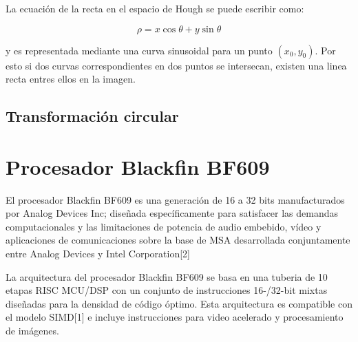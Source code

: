 %


La ecuación de la recta en el espacio de Hough se puede escribir como:

\begin{equation}
\rho = x\cos\theta + y\sin\theta
\end{equation}

y es representada mediante una curva sinusoidal para un punto $(x_{0},y_{0})$. Por esto si dos curvas correspondientes en dos puntos se intersecan, existen una linea recta entres ellos en la imagen.  

\subsection{Transformación circular}


\section{Procesador Blackfin BF609}

El procesador Blackfin BF609 es una generación de 16 a 32 bits manufacturados por Analog Devices Inc; diseñada específicamente para satisfacer las demandas computacionales y las limitaciones de potencia de audio embebido, vídeo y aplicaciones de comunicaciones sobre la base de MSA desarrollada conjuntamente entre Analog Devices y Intel Corporation[2] 

La arquitectura del procesador Blackfin BF609 se basa en una tuberia de 10 etapas RISC MCU/DSP con un conjunto de instrucciones 16-/32-bit mixtas diseñadas para la densidad de código óptimo. Esta arquitectura es compatible con el modelo SIMD[1] e incluye instrucciones para video acelerado y procesamiento de imágenes.  

